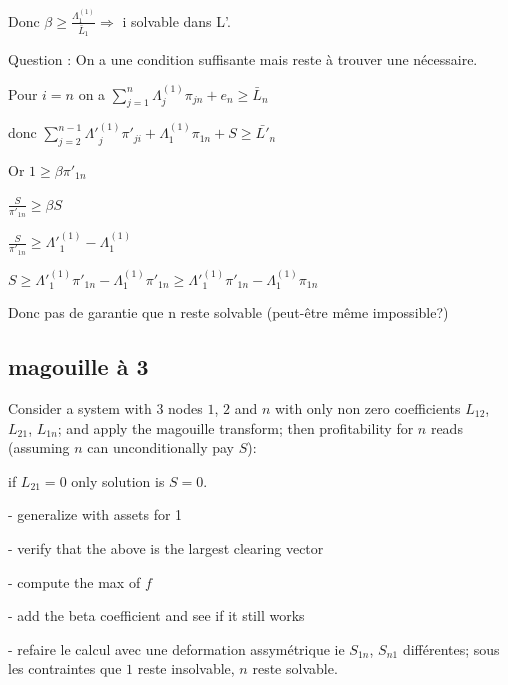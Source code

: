 \documentclass[11pt,oneside,twocolumn]{article}
\begin{document}
Donc $\beta \geq \frac{\Lambda^{(1)}_{1}}{\bar{L}_{1}} \Rightarrow$ i solvable dans L'.

Question : On a une condition suffisante mais reste à trouver une nécessaire.

\begin{center}
Pour $i = n$ on a $ \sum_{j=1}^{n} \Lambda^{(1)}_{j} \pi_{jn} + e_{n} \geq \bar{L}_{n}$

donc $ \sum_{j=2}^{n-1} \Lambda'^{(1)}_{j} \pi'_{ji} + \Lambda^{(1)}_{1} \pi_{1n} + S \geq \bar{L'}_{n}$ 
\end{center}

Or $1 \geq \beta \pi'_{1n}$

$\frac{S}{\pi'_{1n}} \geq \beta S$

$\frac{S}{\pi'_{1n}} \geq \Lambda'^{(1)}_{1} - \Lambda^{(1)}_{1}$

$S \geq \Lambda'^{(1)}_{1} \pi'_{1n} - \Lambda^{(1)}_{1} \pi'_{1n} \geq \Lambda'^{(1)}_{1} \pi'_{1n} - \Lambda^{(1)}_{1} \pi_{1n}$

Donc pas de garantie que n reste solvable (peut-être même impossible?)

\subsection{magouille à 3}
Consider a system with 3 nodes $1$, $2$ and $n$ with only non zero coefficients $L_{12}$, $L_{21}$, $L_{1n}$; and apply the magouille transform; then profitability for $n$ reads (assuming $n$ can unconditionally pay $S$):




if $L_{21}=0$ only solution is $S=0$. 

- generalize with assets for 1

- verify that the above is the largest clearing vector

- compute the max of $f$

- add the beta coefficient and see if it still works

- refaire le calcul avec une deformation assymétrique ie $S_{1n}$, $S_{n1}$
différentes; sous les contraintes que $1$ reste insolvable, $n$ reste solvable.
\end{document}
